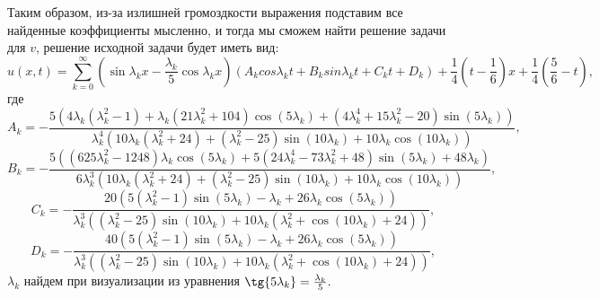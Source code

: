 \documentclass[11pt]{article}
\begin{document}
Таким образом, из-за излишней громоздкости выражения подставим все найденные коэффициенты мысленно, и тогда мы сможем найти решение задачи для $v$, решение исходной задачи будет иметь вид: $$u(x,t)=\sum^\infty_{k=0}(\sin{\lambda_k x}-\frac{\lambda_k}{5}\cos{\lambda_k x})(A_kcos\lambda_kt+B_ksin\lambda_kt+C_kt+D_k)+\frac{1}{4}(t-\frac{1}{6})x+\frac{1}{4}(\frac{5}{6}-t),$$
где
$$A_k=-\frac{5 \left(4 \lambda_k  \left(\lambda_k ^2-1\right)+\lambda_k  \left(21 \lambda_k ^2+104\right) \cos (5 \lambda_k )+\left(4 \lambda_k ^4+15 \lambda_k ^2-20\right) \sin (5 \lambda_k )\right)}{\lambda_k ^4 \left(10 \lambda_k  \left(\lambda_k ^2+24\right)+\left(\lambda_k ^2-25\right) \sin (10 \lambda_k )+10 \lambda_k  \cos (10 \lambda_k )\right)},$$
$$B_k=-\frac{5 \left(\left(625 \lambda_k ^2-1248\right) \lambda_k  \cos (5 \lambda_k )+5 \left(24 \lambda_k ^4-73 \lambda_k ^2+48\right) \sin (5 \lambda_k )+48 \lambda_k \right)}{6 \lambda_k ^3 \left(10 \lambda_k  \left(\lambda_k ^2+24\right)+\left(\lambda_k ^2-25\right) \sin (10 \lambda_k )+10 \lambda_k  \cos (10 \lambda_k )\right)},$$
$$C_k = -\frac{20 \left(5 \left(\lambda_k ^2-1\right) \sin (5 \lambda_k )-\lambda_k +26 \lambda_k  \cos (5 \lambda_k )\right)}{\lambda_k^3  \left(\left(\lambda_k ^2-25\right) \sin (10 \lambda_k )+10 \lambda_k  \left(\lambda_k ^2+\cos (10 \lambda_k )+24\right)\right)},$$
$$D_k = -\frac{40\left(5 \left(\lambda_k ^2-1\right) \sin (5 \lambda_k )-\lambda_k +26 \lambda_k  \cos (5 \lambda_k )\right)}{\lambda_k^3  \left(\left(\lambda_k ^2-25\right) \sin (10 \lambda_k )+10 \lambda_k  \left(\lambda_k ^2+\cos (10 \lambda_k )+24\right)\right)},$$
$\lambda_k$ найдем при визуализации из уравнения $\tg{5\lambda_k}=\frac{\lambda_k}{5}.$ 
\end{document}
